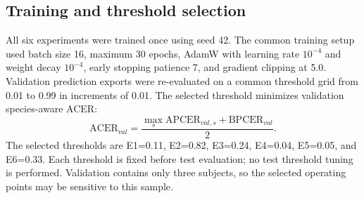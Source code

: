 \documentclass[a4paper,conference]{IEEEtran}
\begin{document}
\subsection{Training and threshold selection}
All six experiments were trained once using seed 42. The common training setup used batch size 16, maximum 30 epochs, AdamW with learning rate $10^{-4}$ and weight decay $10^{-4}$, early stopping patience 7, and gradient clipping at 5.0. Validation prediction exports were re-evaluated on a common threshold grid from 0.01 to 0.99 in increments of 0.01. The selected threshold minimizes validation species-aware ACER:
\begin{equation}
\mathrm{ACER}_{val}=\frac{\max_s\mathrm{APCER}_{val,s}+\mathrm{BPCER}_{val}}{2}.
\end{equation}
The selected thresholds are E1=0.11, E2=0.82, E3=0.24, E4=0.04, E5=0.05, and E6=0.33. Each threshold is fixed before test evaluation; no test threshold tuning is performed. Validation contains only three subjects, so the selected operating points may be sensitive to this sample.
\end{document}
